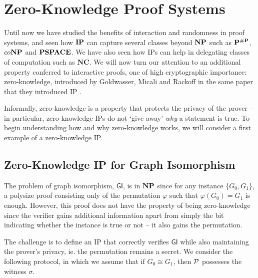 \section{Zero-Knowledge Proof Systems}

Until now we have studied the benefits of interaction and randomness in proof systems, and seen how $\mathbf{IP}$ can capture several classes beyond $\mathbf{NP}$ such as $\mathbf{P}^{\#\mathbf{P}}$, $co\mathbf{NP}$ and $\mathbf{PSPACE}$. We have also seen how IPs can help in delegating classes of computation such as $\mathbf{NC}$. We will now turn our attention to an additional property conferred to interactive proofs, one of high cryptographic importance: zero-knowledge, introduced by Goldwasser, Micali and Rackoff in the same paper that they introduced IP \cite{10.1145/22145.22178}.

Informally, zero-knowledge is a property that protects the privacy of the prover -- in particular, zero-knowledge IPs do not `give away' \textit{why} a statement is true. To begin understanding how and why zero-knowledge works, we will consider a first example of a zero-knowledge IP.

\subsection{Zero-Knowledge IP for Graph Isomorphism}

The problem of graph isomorphism, $\mathsf{GI}$, is in $\mathbf{NP}$ since for any instance $\{G_0, G_1\}$, a polysize proof consisting only of the permutation $\varphi$ such that $\varphi(G_0)=G_1$ is enough. However, this proof does not have the property of being zero-knowledge since the verifier gains additional information apart from simply the bit indicating whether the instance is true or not -- it also gains the permutation. 

The challenge is to define an IP that correctly verifies $\mathsf{GI}$ while also maintaining the prover's privacy, ie. the permutation remains a secret. We consider the following protocol, in which we assume that if $G_0\cong G_1$, then $\mathcal{P}$ possesses the witness $\sigma$.

